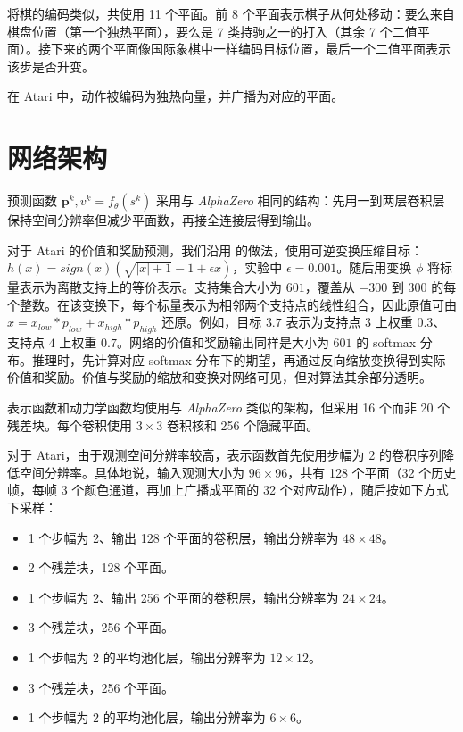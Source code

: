 \documentclass{article}
\newcommand{\alphazero}{\emph{AlphaZero}}
\begin{document}
\begin{appendices}
将棋的编码类似，共使用 11 个平面。前 8 个平面表示棋子从何处移动：要么来自棋盘位置（第一个独热平面），要么是 7 类持驹之一的打入（其余 7 个二值平面）。接下来的两个平面像国际象棋中一样编码目标位置，最后一个二值平面表示该步是否升变。

在 Atari 中，动作被编码为独热向量，并广播为对应的平面。

\section{网络架构}

\label{sec:network_architecture}

预测函数 $\mathbf{p}^k, v^k = f_\theta(s^k)$ 采用与 \alphazero{} 相同的结构：先用一到两层卷积层保持空间分辨率但减少平面数，再接全连接层得到输出。

对于 Atari 的价值和奖励预测，我们沿用 \cite{pohlen2018observe} 的做法，使用可逆变换压缩目标：
$h(x) = sign(x)(\sqrt{|x| + 1} - 1 + \epsilon x)$，实验中 $\epsilon = 0.001$。随后用变换 $\phi$ 将标量表示为离散支持上的等价表示。支持集合大小为 $601$，覆盖从 $-300$ 到 $300$ 的每个整数。在该变换下，每个标量表示为相邻两个支持点的线性组合，因此原值可由 $x = x_{low} * p_{low} + x_{high} * p_{high}$ 还原。例如，目标 $3.7$ 表示为支持点 $3$ 上权重 $0.3$、支持点 $4$ 上权重 $0.7$。网络的价值和奖励输出同样是大小为 $601$ 的 softmax 分布。推理时，先计算对应 softmax 分布下的期望，再通过反向缩放变换得到实际价值和奖励。价值与奖励的缩放和变换对网络可见，但对算法其余部分透明。

表示函数和动力学函数均使用与 \alphazero{} 类似的架构，但采用 16 个而非 20 个残差块\cite{he:resnet}。每个卷积使用 $3 \times 3$ 卷积核和 256 个隐藏平面。

对于 Atari，由于观测空间分辨率较高，表示函数首先使用步幅为 2 的卷积序列降低空间分辨率。具体地说，输入观测大小为 $96 \times 96$，共有 128 个平面（32 个历史帧，每帧 3 个颜色通道，再加上广播成平面的 32 个对应动作），随后按如下方式下采样：

\begin{itemize}
\item 1 个步幅为 2、输出 128 个平面的卷积层，输出分辨率为 $48 \times 48$。
\item 2 个残差块，128 个平面。
\item 1 个步幅为 2、输出 256 个平面的卷积层，输出分辨率为 $24 \times 24$。
\item 3 个残差块，256 个平面。
\item 1 个步幅为 2 的平均池化层，输出分辨率为 $12 \times 12$。
\item 3 个残差块，256 个平面。
\item 1 个步幅为 2 的平均池化层，输出分辨率为 $6 \times 6$。
\end{itemize}


\end{appendices}
\end{document}
